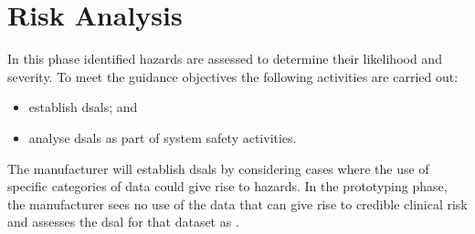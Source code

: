 \section{Risk Analysis}
\begin{minipage}[t]{0.73\textwidth}
  In this phase identified \glspl{hazard} are assessed to determine their likelihood and severity. To meet the guidance objectives the following activities are carried out:
  \begin{itemize}
    \item establish \glspl{dsal}; and
    \item analyse \glspl{dsal} as part of system safety activities.
  \end{itemize}
\end{minipage}
\begin{minipage}[t]{0.25\textwidth}
  \centering{}
\end{minipage}

The manufacturer will establish \glspl{dsal} by considering cases where the use of specific categories of data could give rise to \glspl{hazard}. In the prototyping phase, the manufacturer sees no use of the data that can give rise to credible clinical risk and assesses the \gls{dsal} for that \gls{dataset} as . 

